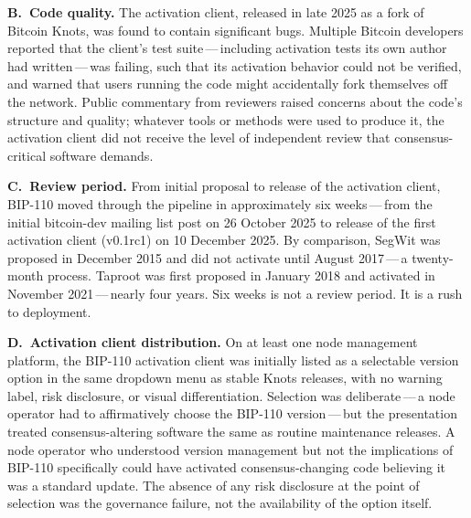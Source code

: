\documentclass[11pt, twoside, openright]{book}
\newcommand{\reqitem}[2]{\medskip\noindent\textbf{#1\ #2}\quad\ignorespaces}
\begin{document}
\reqitem{B.}{Code quality.} The activation client, released in late 2025 as a fork of Bitcoin Knots, was found to contain significant bugs. Multiple Bitcoin developers reported that the client's test suite\,---\,including activation tests its own author had written\,---\,was failing, such that its activation behavior could not be verified, and warned that users running the code might accidentally fork themselves off the network. Public commentary from reviewers raised concerns about the code's structure and quality; whatever tools or methods were used to produce it, the activation client did not receive the level of independent review that consensus-critical software demands.

\reqitem{C.}{Review period.} From initial proposal to release of the activation client, BIP-110 moved through the pipeline in approximately six weeks\,---\,from the initial bitcoin-dev mailing list post on 26 October 2025 to release of the first activation client (v0.1rc1) on 10 December 2025. By comparison, SegWit was proposed in December 2015 and did not activate until August 2017\,---\,a twenty-month process. Taproot was first proposed in January 2018 and activated in November 2021\,---\,nearly four years. Six weeks is not a review period. It is a rush to deployment.

\reqitem{D.}{Activation client distribution.} On at least one node management platform, the BIP-110 activation client was initially listed as a selectable version option in the same dropdown menu as stable Knots releases, with no warning label, risk disclosure, or visual differentiation. Selection was deliberate\,---\,a node operator had to affirmatively choose the BIP-110 version\,---\,but the presentation treated consensus-altering software the same as routine maintenance releases. A node operator who understood version management but not the implications of BIP-110 specifically could have activated consensus-changing code believing it was a standard update. The absence of any risk disclosure at the point of selection was the governance failure, not the availability of the option itself.
\end{document}
